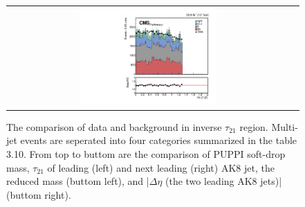 \begin{figure}[t]
\begin{tabular}{cc}
    \includegraphics[width=0.5\textwidth]{Figures/dataMC_trig_antiTau21/deltaEta.pdf} \\
  \end{tabular}
  \caption{The comparison of data and background in inverse $\tau _{21}$ region. Multi-jet events are seperated into four categories summarized in the table 3.10. From top to buttom are the comparison of PUPPI soft-drop mass, $\tau _{21}$ of leading (left) and next leading (right) AK8 jet, the reduced mass (buttom left), and |$\Delta \eta $ (the two leading AK8 jets)| (buttom right).}
  \label{fig:hvt_brs}
\end{figure}

